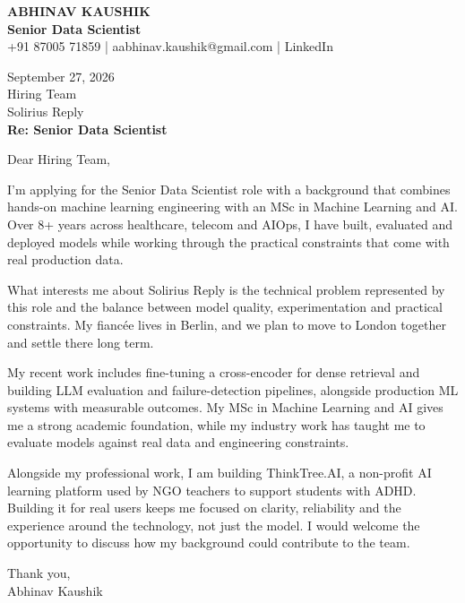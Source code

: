 \documentclass[10pt,a4paper]{article}
\begin{document}
\begin{center}
{\Large\bfseries ABHINAV KAUSHIK}\\[2pt]
{\bfseries Senior Data Scientist}\\[2pt]
+91 87005 71859 \quad | \quad aabhinav.kaushik@gmail.com \quad | \quad LinkedIn
\end{center}
\vspace{8pt}
September 27, 2026\\[6pt]
Hiring Team\\
Solirius Reply\\[4pt]
\textbf{Re: Senior Data Scientist}

Dear Hiring Team,

I’m applying for the Senior Data Scientist role with a background that combines hands-on machine learning engineering with an MSc in Machine Learning and AI. Over 8+ years across healthcare, telecom and AIOps, I have built, evaluated and deployed models while working through the practical constraints that come with real production data.

What interests me about Solirius Reply is the technical problem represented by this role and the balance between model quality, experimentation and practical constraints. My fiancée lives in Berlin, and we plan to move to London together and settle there long term.

My recent work includes fine-tuning a cross-encoder for dense retrieval and building LLM evaluation and failure-detection pipelines, alongside production ML systems with measurable outcomes. My MSc in Machine Learning and AI gives me a strong academic foundation, while my industry work has taught me to evaluate models against real data and engineering constraints.

Alongside my professional work, I am building ThinkTree.AI, a non-profit AI learning platform used by NGO teachers to support students with ADHD. Building it for real users keeps me focused on clarity, reliability and the experience around the technology, not just the model. I would welcome the opportunity to discuss how my background could contribute to the team.

Thank you,\\
Abhinav Kaushik
\end{document}
